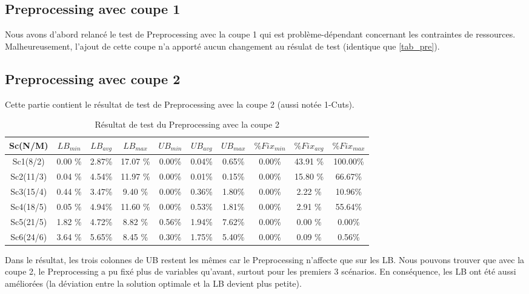 \documentclass[twoside,fleqn]{EPURapport}
\begin{document}
\subsection{Preprocessing avec coupe 1}
Nous avons d'abord relancé le test de Preprocessing avec la coupe 1 qui est problème-dépendant concernant les contraintes de ressources. Malheureusement, l'ajout de cette coupe n'a apporté aucun changement au résulat de test (identique que \ref{tab_pre}).

\subsection{Preprocessing avec coupe 2}
Cette partie contient le résultat de test de Preprocessing avec la coupe 2 (aussi notée 1-Cuts).

\begin{table}[h]
    \centering
    \begin{tabular}{|c|c|c|c|c|c|c|c|c|c|}
    	\hline
Sc(N/M)	& $LB_{min}$ & $LB_{avg}$ & $LB_{max}$ & $UB_{min}$ & $UB_{avg}$ & $UB_{max}$ & $\%Fix_{min}$ & $\%Fix_{avg}$ & $\%Fix_{max}$\\ \hline
Sc1(8/2) & 0.00 \% &	2.87\%  &	17.07	\%  &0.00\% & 0.04\%  &0.65\%  &0.00\%  &43.91	\% &100.00\% \\ \hline
Sc2(11/3)& 0.04 \% & 	4.54\% & 	11.97	\% & 0.00\%&  0.01\% & 0.15\% & 0.00\%  &15.80	\% &66.67\%\\ \hline
Sc3(15/4)& 0.44 \% & 	3.47\% & 	9.40	\% & 0.00\%&  0.36\% & 1.80\% & 0.00\%  &2.22	\% &10.96\%\\ \hline
Sc4(18/5)& 0.05 \% & 	4.94\% & 	11.60	\% & 0.00\%&  0.53\% & 1.81\% & 0.00\%  &2.91	\% &55.64\%\\ \hline
Sc5(21/5)& 1.82 \% & 	4.72\% & 	8.82	\%  &0.56\% & 1.94\%  &7.62\%  &0.00\%  &0.00	\% &0.00\%\\ \hline
Sc6(24/6)& 3.64 \% & 	5.65\% & 	8.45	\%  &0.30\% & 1.75\%  &5.40\%  &0.00\%  &0.09	\% &0.56\%\\ \hline
    \end{tabular}
    \label{tab_pre_x}
    \caption{Résultat de test du Preprocessing avec la coupe 2}
\end{table}
\bigskip

Dans le résultat, les trois colonnes de UB restent les mêmes car le Preprocessing n'affecte que sur les LB. Nous pouvons trouver que avec la coupe 2, le Preprocessing a pu fixé plus de variables qu'avant, surtout pour les premiers 3 scénarios. En conséquence, les LB ont été aussi améliorées (la déviation entre la solution optimale et la LB devient plus petite).
\end{document}
